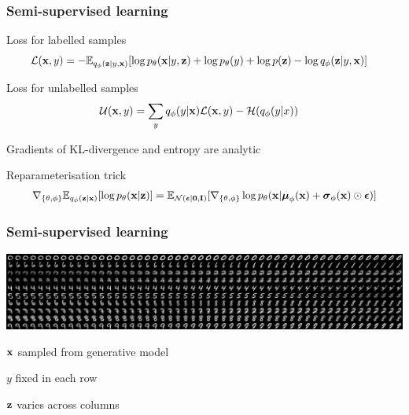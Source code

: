 \documentclass[10pt]{beamer}
\begin{document}
\begin{frame}
  \frametitle{Semi-supervised learning}

  Loss for labelled samples
  \begin{align*}
    \mathcal{L}(\boldsymbol{\mathbf{x}},y) &=
      - \mathbb{E}_{q_\phi(\boldsymbol{\mathbf{z}}|y, \boldsymbol{\mathbf{x}})}[
        \log p_\theta(\boldsymbol{\mathbf{x}}|y, \boldsymbol{\mathbf{z}})
        + \log p_\theta(y)
        + \log p(\boldsymbol{\mathbf{z}})
        - \log q_\phi(\boldsymbol{\mathbf{z}}|y, \boldsymbol{\mathbf{x}})]
  \end{align*}

  Loss for unlabelled samples
  \begin{align*}
    \mathcal{U}(\boldsymbol{\mathbf{x}},y) &=
      \sum_y q_\phi(y|\boldsymbol{\mathbf{x}}) \mathcal{L}(\boldsymbol{\mathbf{x}}, y)
      - \mathcal{H}(q_\phi(y|x))
  \end{align*}

  Gradients of KL-divergence and entropy are analytic

  \begin{block}{Reparameterisation trick}
    \begin{align*}
      \nabla_{\{\theta,\phi\}}\mathbb{E}_{q_\phi(\boldsymbol{\mathbf{z}}|\boldsymbol{\mathbf{x}})}[\log p_\theta(\boldsymbol{\mathbf{x}}|\boldsymbol{\mathbf{z}})]
      =
      \mathbb{E}_{\mathcal{N}(\boldsymbol{\mathbf{\epsilon}}|\boldsymbol{\mathbf{0}}, \boldsymbol{\mathbf{I}})}[
      \nabla_{\{\theta,\phi\}} \log p_\theta(\boldsymbol{\mathbf{x}}|\boldsymbol{\mathbf{\mu}}_\phi(\boldsymbol{\mathbf{x}}) + \boldsymbol{\mathbf{\sigma}}_\phi(\boldsymbol{\mathbf{x}}) \odot \boldsymbol{\mathbf{\epsilon}})]
    \end{align*}
  \end{block}
\end{frame}



\begin{frame}
  \frametitle{Semi-supervised learning}
  \includegraphics[width=\textwidth]{img/semi-M2-072}

  $\boldsymbol{\mathbf{x}}$ sampled from generative model

  $y$ fixed in each row

  $\boldsymbol{\mathbf{z}}$ varies across columns
\end{frame}
\end{document}

